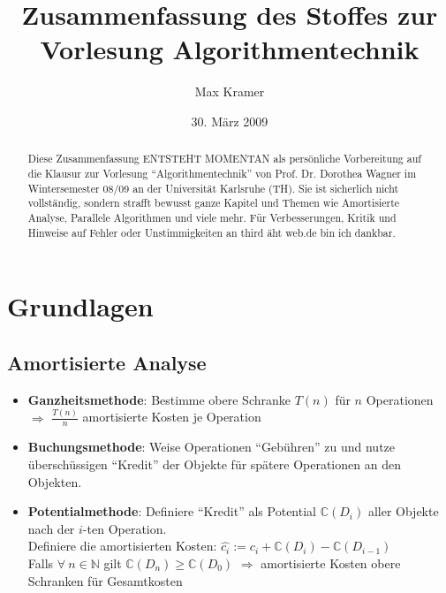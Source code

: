 \documentclass[a4paper,10pt]{scrartcl}
\title{Zusammenfassung des Stoffes zur Vorlesung Algorithmentechnik}
\author{Max Kramer}
\date{30. März 2009}
\newcommand{\tbf}{\textbf}
\newcommand{\Ra}{\Rightarrow}
\newcommand{\nat}{\mathbb{N}}
\begin{document}
\maketitle

\begin{abstract}
Diese Zusammenfassung ENTSTEHT MOMENTAN als persönliche Vorbereitung auf die Klausur zur Vorlesung ``Algorithmentechnik'' von Prof. Dr. Dorothea Wagner im Wintersemester 08/09 an der Universität Karlsruhe (TH). Sie ist sicherlich nicht vollständig, sondern strafft bewusst ganze Kapitel und Themen wie Amortisierte Analyse, Parallele Algorithmen und viele mehr. Für Verbesserungen, Kritik und Hinweise auf Fehler oder Unstimmigkeiten an third äht web.de bin ich dankbar.
\end{abstract}

\setcounter{tocdepth}{1}
\tableofcontents

\newpage
\listofalgorithms


\newpage
\setcounter{section}{-1}
\section{Grundlagen}
\subsection{Amortisierte Analyse}
\begin{itemize}
 \item \tbf{Ganzheitsmethode}: Bestimme obere Schranke $T(n)$ für $n$ Operationen $\Ra$ $\frac{T(n)}{n}$ amortisierte Kosten je Operation
 \item \tbf{Buchungsmethode}: Weise Operationen ``Gebühren'' zu und nutze überschüssigen ``Kredit'' der Objekte für spätere Operationen an den Objekten.
 \item \tbf{Potentialmethode}: Definiere ``Kredit'' als Potential $\mathbb{C}(D_i)$ aller Objekte nach der $i$-ten Operation. \\
	Definiere die amortisierten Kosten: $\hat{c_i} := c_i + \mathbb{C}(D_i) - \mathbb{C}(D_{i-1})$ \\
	Falls $\forall \ n \in \nat$ gilt $\mathbb{C}(D_n) \geq \mathbb{C}(D_0)$ $\Ra$ amortisierte Kosten obere Schranken für Gesamtkosten
\end{itemize}
\end{document}
